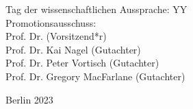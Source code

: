 \begin{flushright}
 	Tag der wissenschaftlichen Aussprache: YY  \\

	\vspace{5mm}
	Promotionsausschuss:\\
	Prof. Dr. (Vorsitzend*r)\\
    	Prof. Dr. Kai Nagel (Gutachter)\\
    	Prof. Dr. Peter Vortisch (Gutachter)\\
    	Prof. Dr. Gregory MacFarlane (Gutachter)\\
	\vspace{6mm}

	Berlin 2023\\

\end{flushright}
